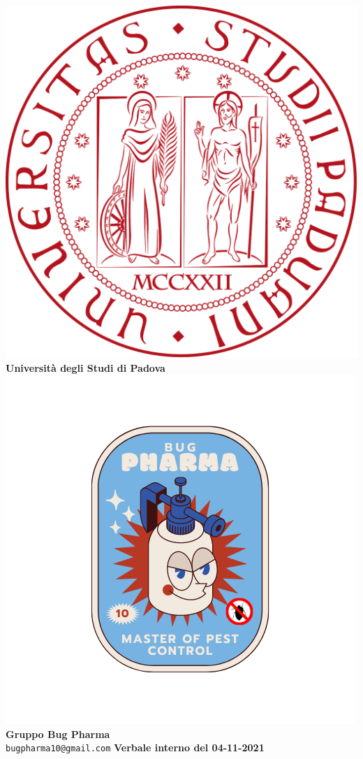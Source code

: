 \documentclass[11pt]{article}
\begin{document}
	\thispagestyle{empty}
	\begin{titlepage}
		\begin{center}
			\includegraphics[scale = 0.05]{../../Res/logo_unipd.png}\\
			\bigskip
			\large \textbf{Università degli Studi di Padova} \\
			\vfill
			\includegraphics[scale = 0.7]{../../Res/BugPharma_Logo.png}\\
			\huge \textbf{Gruppo Bug Pharma} \\
			\vfill
			\large \texttt{bugpharma10@gmail.com}
			\vfill
			\Huge \textbf{Verbale interno del 04-11-2021}\\
			

\end{center}
\end{titlepage}
\end{document}
